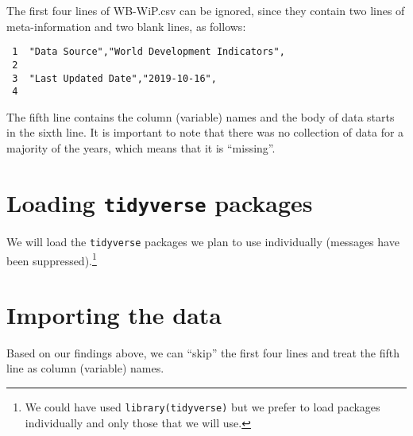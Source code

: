 \documentclass[a4paper,9pt,twocolumn,twoside,]{pinp}
\begin{document}
The first four lines of WB-WiP.csv can be ignored, since they contain
two lines of meta-information and two blank lines, as follows:

\begin{verbatim}
 1  ﻿"Data Source","World Development Indicators",
 2  
 3  "Last Updated Date","2019-10-16",
 4  
\end{verbatim}

The fifth line contains the column (variable) names and the body of data
starts in the sixth line. It is important to note that there was no
collection of data for a majority of the years, which means that it is
``missing''.

\hypertarget{loading-tidyverse-packages}{%
\section{\texorpdfstring{Loading \texttt{tidyverse}
packages}{Loading tidyverse packages}}\label{loading-tidyverse-packages}}

We will load the \texttt{tidyverse} packages we plan to use individually
(messages have been suppressed).\footnote{We could have used
  \texttt{library(tidyverse)} but we prefer to load packages
  individually and only those that we will use.}

\begin{Shaded}
\begin{Highlighting}[]
\end{Highlighting}
\end{Shaded}

\hypertarget{importing-the-data}{%
\section{Importing the data}\label{importing-the-data}}

Based on our findings above, we can ``skip'' the first four lines and
treat the fifth line as column (variable) names.

\begin{Shaded}
\begin{Highlighting}[]
\StringTok{ }\NormalTok{(}\NormalTok{(}\NormalTok{, }\NormalTok{), }
              \NormalTok{)}
\end{Highlighting}
\end{Shaded}
\end{document}

